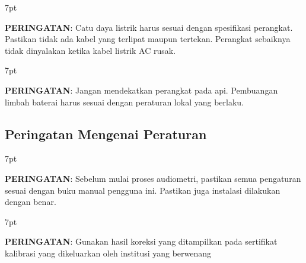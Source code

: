 \documentclass[11pt,a4paper,twoside,draft,onecolumn]{book}
\newenvironment{formalred}{%
	\def\FrameCommand{%
		\hspace{1pt}%
		{\color{red}\vrule width 2pt}%
		{\color{formalshade}\vrule width 4pt}%
		\colorbox{formalshade}%
	}%
	\MakeFramed{\advance\hsize-\width\FrameRestore}%
	\noindent\hspace{-4.55pt}%
	\begin{adjustwidth}{}{7pt}%
		\vspace{2pt}\vspace{2pt}%
	}
	{%
		\vspace{2pt}\end{adjustwidth}\endMakeFramed%
}
\begin{document}
				\begin{formalred}
					\raisebox{0.125ex}{\resizebox{!}{2ex}{\danger}} \textbf{PERINGATAN}: 
					Catu daya listrik harus sesuai dengan spesifikasi perangkat. Pastikan tidak ada kabel yang terlipat maupun tertekan. Perangkat sebaiknya tidak dinyalakan ketika kabel listrik AC rusak. 
				\end{formalred}
				
				\begin{formalred}
					\raisebox{0.125ex}{\resizebox{!}{2ex}{\danger}} \textbf{PERINGATAN}: 
					Jangan mendekatkan perangkat pada api. Pembuangan limbah baterai harus sesuai dengan peraturan lokal yang berlaku.
				\end{formalred}
			
			\subsection{Peringatan Mengenai Peraturan}
				\begin{formalred}
					\raisebox{0.125ex}{\resizebox{!}{2ex}{\danger}} \textbf{PERINGATAN}: 
					Sebelum mulai proses audiometri, pastikan semua pengaturan sesuai dengan buku manual pengguna ini. Pastikan juga instalasi dilakukan dengan benar.
				\end{formalred}
				
				\begin{formalred}
					\raisebox{0.125ex}{\resizebox{!}{2ex}{\danger}} \textbf{PERINGATAN}: 
					Gunakan hasil koreksi yang ditampilkan pada sertifikat kalibrasi yang dikeluarkan oleh institusi yang berwenang
				\end{formalred}	
			
\end{document}
